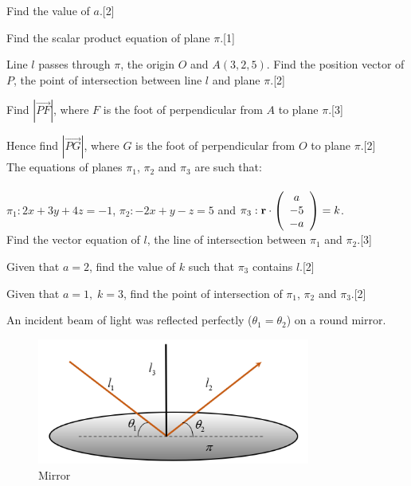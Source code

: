 \documentclass[12pt, a4 paper]{article}
\begin{document}
\begin{outline}[enumerate]
	\2 Find the value of $a$.\hfill[2]

	\2 Find the scalar product equation of plane $\pi $.\hfill[1]

	\2 Line ${l}$ passes through $\pi $, the origin $O$ and $A(3,2,5)$. Find the position vector of $P$, the point of intersection between line ${l}$ and plane $\pi $.\hfill[2]

	\2 Find $\left| {\overrightarrow {PF} } \right|$, where $F$ is the foot of perpendicular from $A$ to plane $\pi $.\hfill[3]

	\2 Hence find $\left| {\overrightarrow {PG} } \right|$, where $G$ is the foot of perpendicular from $O$ to plane $\pi $.\hfill[2]\\

	\1 The equations of planes ${\pi _1}$, ${\pi _2}$ and ${\pi _3}$ are such that: \\\\
	${\pi _1}:2x + 3y + 4z =  - 1$, \;\;  ${\pi _2}: - 2x + y - z = 5$ \;\;  and\;\;   ${\pi _3}:{\bf{r}} \cdot \left( {\begin{array}{*{20}{c}}a\\{ - 5}\\{ - a}\end{array}} \right) = k$.\\

	\2 Find the vector equation of $l$, the line of intersection between ${\pi _1}$ and ${\pi _2}$.\hfill[3]

	\2 Given that $a = 2$, find the value of $k$ such that ${\pi _3}$ contains $l$.\hfill[2]

	\2 Given that $a = 1,\;k = 3$, find the point of intersection of ${\pi _1}$, ${\pi _2}$ and ${\pi _3}$.\hfill[2]\\

	\newpage

	\1 An incident beam of light was reflected perfectly (${\theta _1} = {\theta _2}$) on a round mirror.

	\begin{figure}[h]
		\centering
		\includegraphics[width=0.8\textwidth]{vectors_mirror}
		\caption{Mirror}
	\end{figure}


\end{outline}
\end{document}
